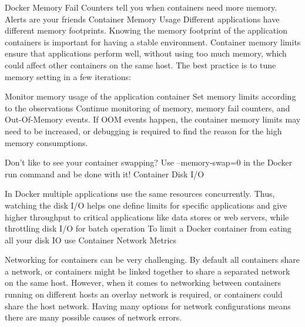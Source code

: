  Docker Memory Fail Counters tell you when containers need more memory.
Alerts are your friends
Container Memory Usage
Different applications have different memory footprints. Knowing the memory footprint of the application containers is important for having a stable environment. Container memory limits ensure that applications perform well, without using too much memory, which could affect other containers on the same host. The best practice is to tune memory setting in a few iterations:

Monitor memory usage of the application container
Set memory limits according to the observations
Continue monitoring of memory, memory fail counters, and Out-Of-Memory events. If OOM events happen, the container memory limits may need to be increased, or debugging is required to find the reason for the high memory consumptions.

Don’t like to see your container swapping?
Use –memory-swap=0 in the Docker run command and be done with it!
Container Disk I/O

In Docker multiple applications use the same resources concurrently. Thus, watching the disk I/O helps one define limits for specific applications and give higher throughput to critical applications like data stores or web servers, while throttling disk I/O for batch operation
To limit a Docker container from eating all your disk IO use
Container Network Metrics

Networking for containers can be very challenging. By default all containers share a network, or containers might be linked together to share a separated network on the same host. However, when it comes to networking between containers running on different hosts an overlay network is required, or containers could share the host network. Having many options for network configurations means there are many possible causes of network errors.
